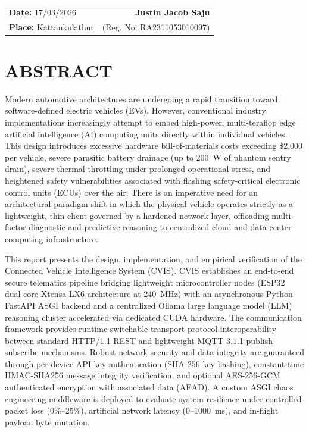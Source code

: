 \documentclass[12pt,a4paper]{report}
\begin{document}
\vspace{2.5cm}
\noindent\begin{tabularx}{\textwidth}{Xr}
\textbf{Date:} 17/03/2026 & \textbf{Justin Jacob Saju} \\
\textbf{Place:} Kattankulathur & (Reg. No: RA2311053010097) \\
\end{tabularx}

\newpage

\chapter*{ABSTRACT}

Modern automotive architectures are undergoing a rapid transition toward software-defined electric vehicles (EVs). However, conventional industry implementations increasingly attempt to embed high-power, multi-teraflop edge artificial intelligence (AI) computing units directly within individual vehicles. This design introduces excessive hardware bill-of-materials costs exceeding \$2,000 per vehicle, severe parasitic battery drainage (up to 200~W of phantom sentry drain), severe thermal throttling under prolonged operational stress, and heightened safety vulnerabilities associated with flashing safety-critical electronic control units (ECUs) over the air. There is an imperative need for an architectural paradigm shift in which the physical vehicle operates strictly as a lightweight, thin client governed by a hardened network layer, offloading multi-factor diagnostic and predictive reasoning to centralized cloud and data-center computing infrastructure.

This report presents the design, implementation, and empirical verification of the Connected Vehicle Intelligence System (CVIS). CVIS establishes an end-to-end secure telematics pipeline bridging lightweight microcontroller nodes (ESP32 dual-core Xtensa LX6 architecture at 240~MHz) with an asynchronous Python FastAPI ASGI backend and a centralized Ollama large language model (LLM) reasoning cluster accelerated via dedicated CUDA hardware. The communication framework provides runtime-switchable transport protocol interoperability between standard HTTP/1.1 REST and lightweight MQTT 3.1.1 publish-subscribe mechanisms. Robust network security and data integrity are guaranteed through per-device API key authentication (SHA-256 key hashing), constant-time HMAC-SHA256 message integrity verification, and optional AES-256-GCM authenticated encryption with associated data (AEAD). A custom ASGI chaos engineering middleware is deployed to evaluate system resilience under controlled packet loss (0\%--25\%), artificial network latency (0--1000~ms), and in-flight payload byte mutation.
\end{document}
